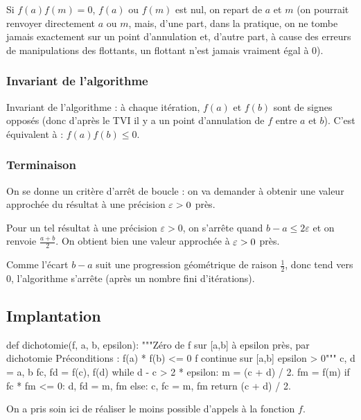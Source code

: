 \begin{rem}
  Si $f(a)f(m)=0$, $f(a)$ ou $f(m)$ est nul, on repart de $a$ et $m$ (on pourrait renvoyer directement $a$ ou $m$, 
mais, d'une part, dans la pratique, on ne tombe jamais exactement sur un point d'annulation et, d'autre 
part, à cause des erreurs de manipulations des flottants, un flottant n'est jamais vraiment égal à 0).
\end{rem}



\subsubsection*{Invariant de l'algorithme}

Invariant de l'algorithme : à chaque itération,  $f(a)$ et $f(b)$ sont de signes opposés (donc
d'après le TVI il y a un point d'annulation de $f$ entre $a$ et $b$). C'est équivalent à : $f(a)f(b)\leq 0$.



\subsubsection*{Terminaison}

On se donne un critère d'arrêt de boucle : on va demander à obtenir une valeur approchée du résultat à une précision $\varepsilon>0$ près. 

Pour un tel résultat à une précision $\varepsilon>0$, on
s'arrête quand $b - a \leq 2\varepsilon$ et on renvoie $\frac{a+b}{2}$.
On obtient bien une valeur approchée à $\varepsilon>0$ près. 

Comme l'écart $b-a$ suit une progression géométrique de raison
  $\frac{1}{2}$, donc tend vers $0$, l'algorithme s'arrête (après un nombre fini d'itérations).

\subsection{Implantation}
\begin{pyverbatim}
def dichotomie(f, a, b, epsilon):
    """Zéro de f sur [a,b] à epsilon près, par dichotomie
       Préconditions : f(a) * f(b) <= 0
                       f continue sur [a,b]
                       epsilon > 0"""
    c, d = a, b
    fc, fd = f(c), f(d)
    while d - c > 2 * epsilon:
        m = (c + d) / 2.
        fm = f(m)
        if fc * fm <= 0:
            d, fd = m, fm
        else:
            c, fc = m, fm
    return (c + d) / 2.
\end{pyverbatim}
\begin{rem}
  On a pris soin ici de réaliser le moins possible d'appels à la fonction $f$.
\end{rem}


